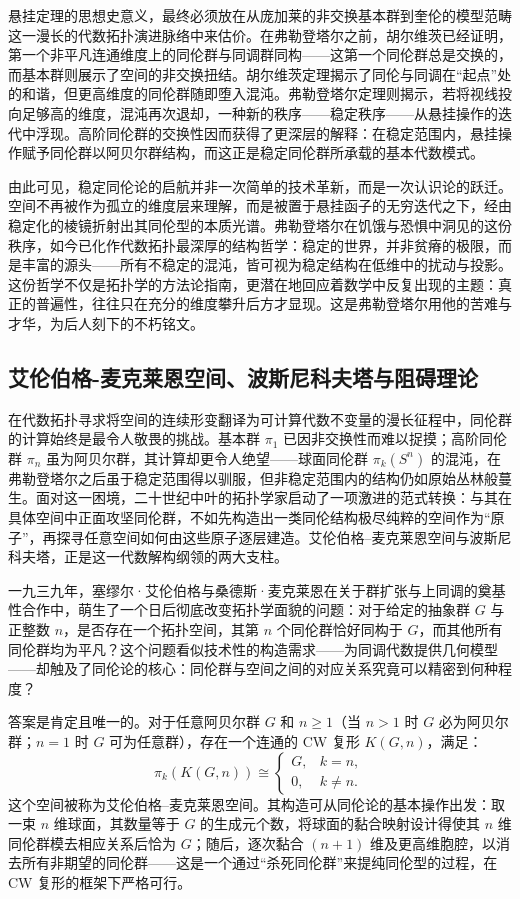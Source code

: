 \documentclass[12pt,a4paper]{article}
\begin{document}
悬挂定理的思想史意义，最终必须放在从庞加莱的非交换基本群到奎伦的模型范畴这一漫长的代数拓扑演进脉络中来估价。在弗勒登塔尔之前，胡尔维茨已经证明，第一个非平凡连通维度上的同伦群与同调群同构——这第一个同伦群总是交换的，而基本群则展示了空间的非交换扭结。胡尔维茨定理揭示了同伦与同调在“起点”处的和谐，但更高维度的同伦群随即堕入混沌。弗勒登塔尔定理则揭示，若将视线投向足够高的维度，混沌再次退却，一种新的秩序——稳定秩序——从悬挂操作的迭代中浮现。高阶同伦群的交换性因而获得了更深层的解释：在稳定范围内，悬挂操作赋予同伦群以阿贝尔群结构，而这正是稳定同伦群所承载的基本代数模式。

由此可见，稳定同伦论的启航并非一次简单的技术革新，而是一次认识论的跃迁。空间不再被作为孤立的维度层来理解，而是被置于悬挂函子的无穷迭代之下，经由稳定化的棱镜折射出其同伦型的本质光谱。弗勒登塔尔在饥饿与恐惧中洞见的这份秩序，如今已化作代数拓扑最深厚的结构哲学：稳定的世界，并非贫瘠的极限，而是丰富的源头——所有不稳定的混沌，皆可视为稳定结构在低维中的扰动与投影。这份哲学不仅是拓扑学的方法论指南，更潜在地回应着数学中反复出现的主题：真正的普遍性，往往只在充分的维度攀升后方才显现。这是弗勒登塔尔用他的苦难与才华，为后人刻下的不朽铭文。

\subsection{艾伦伯格-麦克莱恩空间、波斯尼科夫塔与阻碍理论}

在代数拓扑寻求将空间的连续形变翻译为可计算代数不变量的漫长征程中，同伦群的计算始终是最令人敬畏的挑战。基本群 $\pi_1$ 已因非交换性而难以捉摸；高阶同伦群 $\pi_n$ 虽为阿贝尔群，其计算却更令人绝望——球面同伦群 $\pi_k(S^n)$ 的混沌，在弗勒登塔尔之后虽于稳定范围得以驯服，但非稳定范围内的结构仍如原始丛林般蔓生。面对这一困境，二十世纪中叶的拓扑学家启动了一项激进的范式转换：与其在具体空间中正面攻坚同伦群，不如先构造出一类同伦结构极尽纯粹的空间作为“原子”，再探寻任意空间如何由这些原子逐层建造。艾伦伯格–麦克莱恩空间与波斯尼科夫塔，正是这一代数解构纲领的两大支柱。

一九三九年，塞缪尔·艾伦伯格与桑德斯·麦克莱恩在关于群扩张与上同调的奠基性合作中，萌生了一个日后彻底改变拓扑学面貌的问题：对于给定的抽象群 $G$ 与正整数 $n$，是否存在一个拓扑空间，其第 $n$ 个同伦群恰好同构于 $G$，而其他所有同伦群均为平凡？这个问题看似技术性的构造需求——为同调代数提供几何模型——却触及了同伦论的核心：同伦群与空间之间的对应关系究竟可以精密到何种程度？

答案是肯定且唯一的。对于任意阿贝尔群 $G$ 和 $n\geq 1$（当 $n>1$ 时 $G$ 必为阿贝尔群；$n=1$ 时 $G$ 可为任意群），存在一个连通的 CW 复形 $K(G,n)$，满足：
$$
\pi_k(K(G,n))\cong\begin{cases}
G, & k=n,\\
0, & k\neq n.
\end{cases}
$$
这个空间被称为艾伦伯格–麦克莱恩空间。其构造可从同伦论的基本操作出发：取一束 $n$ 维球面，其数量等于 $G$ 的生成元个数，将球面的黏合映射设计得使其 $n$ 维同伦群模去相应关系后恰为 $G$；随后，逐次黏合 $(n+1)$ 维及更高维胞腔，以消去所有非期望的同伦群——这是一个通过“杀死同伦群”来提纯同伦型的过程，在 CW 复形的框架下严格可行。
\end{document}
